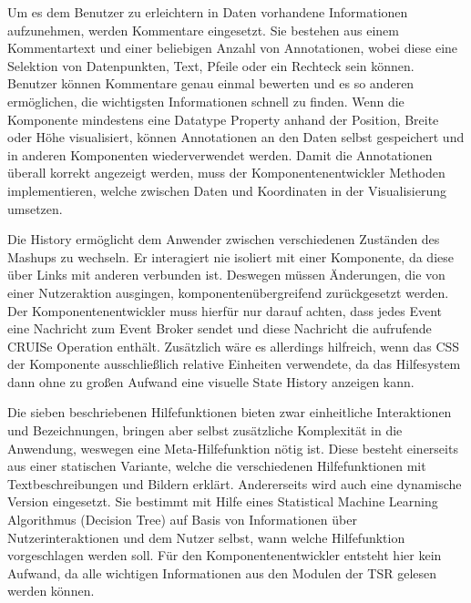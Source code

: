 \documentclass[
	headsepline,
	footsepline,
	fontsize=12pt,
	bibliography=totoc
]{scrbook}
\begin{document}
Um es dem Benutzer zu erleichtern in Daten vorhandene Informationen aufzunehmen, werden Kommentare eingesetzt. Sie bestehen aus einem Kommentartext und einer beliebigen Anzahl von Annotationen, wobei diese eine Selektion von Datenpunkten, Text, Pfeile oder ein Rechteck sein können. Benutzer können Kommentare genau einmal bewerten und es so anderen ermöglichen, die wichtigsten Informationen schnell zu finden. Wenn die Komponente mindestens eine Datatype Property anhand der Position, Breite oder Höhe visualisiert, können Annotationen an den Daten selbst gespeichert und in anderen Komponenten wiederverwendet werden. Damit die Annotationen überall korrekt angezeigt werden, muss der Komponentenentwickler Methoden implementieren, welche zwischen Daten und Koordinaten in der Visualisierung umsetzen.


Die History ermöglicht dem Anwender zwischen verschiedenen Zuständen des Mashups zu wechseln. Er interagiert nie isoliert mit einer Komponente, da diese über Links mit anderen verbunden ist. Deswegen müssen Änderungen, die von einer Nutzeraktion ausgingen, komponentenübergreifend zurückgesetzt werden. Der Komponentenentwickler muss hierfür nur darauf achten, dass jedes Event eine Nachricht zum Event Broker sendet und diese Nachricht die aufrufende CRUISe Operation enthält. Zusätzlich wäre es allerdings hilfreich, wenn das CSS der Komponente ausschließlich relative Einheiten verwendete, da das Hilfesystem dann ohne zu großen Aufwand eine visuelle State History anzeigen kann.



Die sieben beschriebenen Hilfefunktionen bieten zwar einheitliche Interaktionen und Bezeichnungen, bringen aber selbst zusätzliche Komplexität in die Anwendung, weswegen eine Meta-Hilfefunktion nötig ist. Diese besteht einerseits aus einer statischen Variante, welche die verschiedenen Hilfefunktionen mit Textbeschreibungen und Bildern erklärt. Andererseits wird auch eine dynamische Version eingesetzt. Sie bestimmt mit Hilfe eines Statistical Machine Learning Algorithmus (Decision Tree) auf Basis von Informationen über Nutzerinteraktionen und dem Nutzer selbst, wann welche Hilfefunktion vorgeschlagen werden soll. Für den Komponentenentwickler entsteht hier kein Aufwand, da alle wichtigen Informationen aus den Modulen der TSR gelesen werden können.
\end{document}
